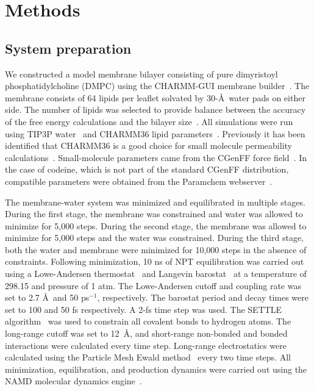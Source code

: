 \section{Methods}

\subsection{System preparation}

\par We constructed a model membrane bilayer consisting of pure dimyristoyl phosphatidylcholine (DMPC) using the CHARMM-GUI membrane builder~\cite{Wu2014a}. The membrane consists of 64 lipids per leaflet solvated by 30-\AA~water pads on either side. The number of lipids was selected to provide balance between the accuracy of the free energy calculations and the bilayer size~\cite{Hu2013}. All simulations were run using TIP3P water~\cite{Jorgensen1983} and CHARMM36 lipid parameters~\cite{Klauda2010}. Previously it has been identified that CHARMM36 is a good choice for small molecule permeability calculations~\cite{Paloncyova2014}.  Small-molecule parameters came from the CGenFF force field~\cite{Vanommeslaeghe2010}.  In the case of codeine, which is not part of the standard CGenFF distribution, compatible parameters were obtained from the Paramchem webserver~\cite{Vanommeslaeghe2012,Vanommeslaeghe2012b}.

\par The membrane-water system was minimized and equilibrated in multiple stages. During the first stage, the membrane was constrained and water was allowed to minimize for 5,000 steps. During the second stage, the membrane was allowed to minimize for 5,000 steps and the water was constrained. During the third stage, both the water and membrane were minimized for 10,000 steps in the absence of constraints. Following minimization, 10 ns of NPT equilibration was carried out using a Lowe-Andersen thermostat~\cite{Koopman2006,Lowe1999} and Langevin barostat~\cite{Feller1995} at a temperature of 298.15 and pressure of 1 atm. The Lowe-Andersen cutoff and coupling rate was set to 2.7 \AA~and 50 ps$^{-1}$, respectively. The barostat period and decay times were set to 100 and 50 fs respectively. A 2-fs time step was used. The SETTLE algorithm~\cite{Miyamoto1992} was used to constrain all covalent bonds to hydrogen atoms. The long-range cutoff was set to 12~\AA, and short-range non-bonded and bonded interactions were calculated every time step. Long-range electrostatics were calculated using the Particle Mesh Ewald method~\cite{Darden1993} every two time steps.  All minimization, equilibration, and production dynamics were carried out using the NAMD molecular dynamics engine~\cite{Phillips2005}.

